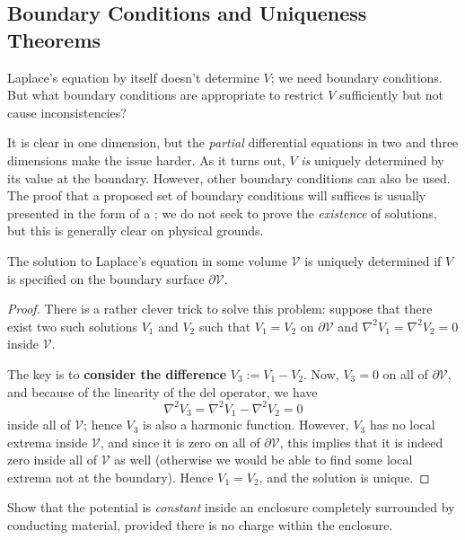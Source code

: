 \subsection{Boundary Conditions and Uniqueness Theorems}

Laplace's equation by itself doesn't determine $V$; we need boundary conditions. But what boundary conditions are appropriate to restrict $V$ sufficiently but not cause inconsistencies?

It is clear in one dimension, but the \textit{partial} differential equations in two and three dimensions make the issue harder.  As it turns out, $V$ \textit{is} uniquely determined by its value at the boundary. However, other boundary conditions can also be used. The proof that a proposed set of boundary conditions will suffices is usually presented in the form of a ; we do not seek to prove the \textit{existence} of solutions, but this is generally clear on physical grounds.

\begin{theorem}
    The solution to Laplace's equation in some volume $\mathcal{V}$ is uniquely determined if $V$ is specified on the boundary surface $\partial\mathcal{V}$.
\end{theorem}

\begin{proof}
There is a rather clever trick to solve this problem: suppose that there exist two such solutions $V_1$ and $V_2$ such that $V_1=V_2$ on $\partial\mathcal{V}$ and $\nabla^2 V_1=\nabla^2 V_2=0$ inside $\mathcal{V}$.

The key is to \textbf{consider the difference} $V_3:=V_1-V_2$. Now, $V_3=0$ on all of $\partial \mathcal{V}$, and because of the linearity of the del operator, we have
\[\nabla^2V_3=\nabla^2 V_1-\nabla^2V_2=0\]
inside all of $\mathcal{V}$; hence $V_3$ is also a harmonic function. However, $V_3$ has no local extrema inside $\mathcal{V}$, and since it is zero on all of $\partial\mathcal{V}$, this implies that it is indeed zero inside all of $\mathcal{V}$ as well (otherwise we would be able to find some local extrema not at the boundary). Hence $V_1=V_2$, and the solution is unique.
\end{proof}

\begin{example}
Show that the potential is \textit{constant} inside an enclosure completely surrounded by conducting material, provided there is no charge within the enclosure.
\end{example}

